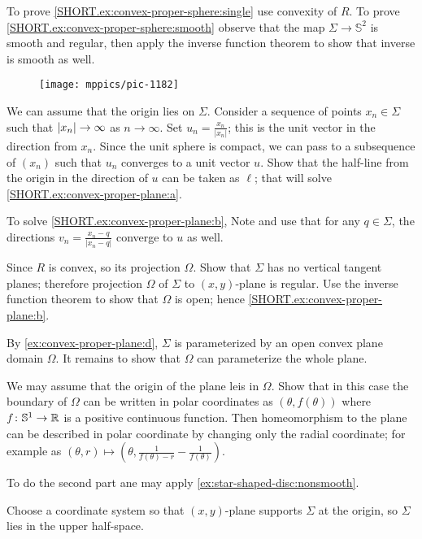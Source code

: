 To prove \ref{SHORT.ex:convex-proper-sphere:single} use convexity of $R$.
To prove \ref{SHORT.ex:convex-proper-sphere:smooth} observe that the map $\Sigma\to\mathbb{S}^2$ is smooth and regular, then apply the inverse function theorem to show that inverse is smooth as well.

\begin{wrapfigure}[16]{o}{29 mm}
\vskip-0mm
\centering
\texttt{[image: mppics/pic-1182]}
\vskip-0mm
\end{wrapfigure}

We can assume that the origin lies on $\Sigma$.
Consider a sequence of points $x_n\in \Sigma$ such that $|x_n|\z\to \infty$ as $n\to \infty$.
Set $u_n=\tfrac{x_n}{|x_n|}$; this is the unit vector in the direction from $x_n$.
Since the unit sphere is compact, we can pass to a subsequence of $(x_n)$ such that $u_n$ converges to a unit vector $u$.
Show that the half-line from the origin in the direction of $u$ can be taken as $\ell$; that will solve \ref{SHORT.ex:convex-proper-plane:a}.

To solve \ref{SHORT.ex:convex-proper-plane:b},
Note and use that for any $q\in \Sigma$, the directions $v_n=\tfrac{x_n-q}{|x_n-q|}$ converge to $u$ as well.

Since $R$ is convex, so its projection $\Omega$.
Show that $\Sigma$ has no vertical tangent planes;
therefore projection $\Omega$ of $\Sigma$ to $(x,y)$-plane is regular.
Use the inverse function theorem to show that $\Omega$ is open; hence \ref{SHORT.ex:convex-proper-plane:b}.

By \ref{ex:convex-proper-plane:d}, $\Sigma$ is parameterized by an open convex plane domain $\Omega$.
It remains to show that $\Omega$ can parameterize the whole plane.

We may assume that the origin of the plane leis in $\Omega$.
Show that in this case the boundary of $\Omega$ can be written in polar coordinates as $(\theta,f(\theta))$ where $f\colon\mathbb{S}^1\to\mathbb{R}$ is a positive continuous function.
Then homeomorphism to the plane can be described in polar coordinate by changing only the radial coordinate;
for example as 
$(\theta,r)\mapsto (\theta,
\tfrac1{f(\theta)-r}-\tfrac1{f(\theta)})$.

To do the second part ane may apply \ref{ex:star-shaped-disc:nonsmooth}.


Choose a coordinate system so that $(x,y)$-plane supports $\Sigma$ at the origin, so $\Sigma$ lies in the upper half-space.

